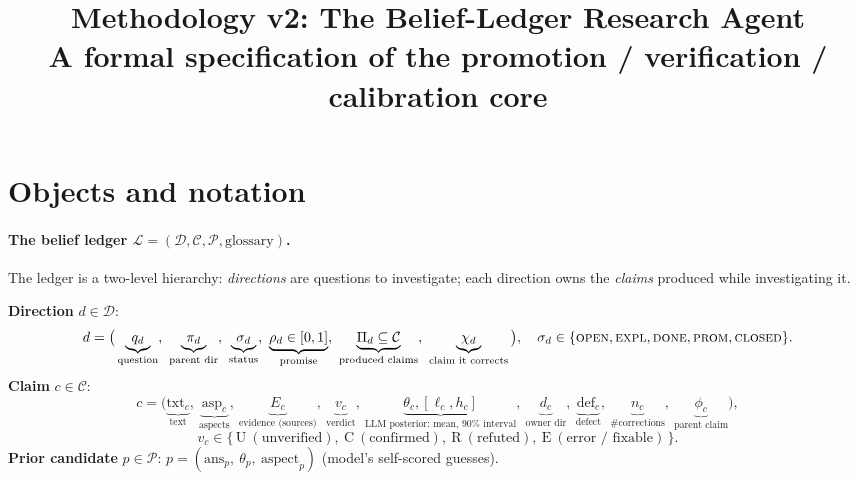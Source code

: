 \documentclass[11pt]{article}
\title{\textbf{Methodology v2: The Belief-Ledger Research Agent}\\[2pt]
\large A formal specification of the promotion / verification / calibration core}
\author{}
\date{}
\newcommand{\Ledger}{\mathcal{L}}
\newcommand{\Dirs}{\mathcal{D}}
\newcommand{\Claims}{\mathcal{C}}
\newcommand{\Priors}{\mathcal{P}}
\begin{document}
\maketitle

\section{Objects and notation}

\paragraph{The belief ledger $\Ledger=(\Dirs,\Claims,\Priors,\mathrm{glossary})$.}
The ledger is a two-level hierarchy: \emph{directions} are questions to investigate; each direction
owns the \emph{claims} produced while investigating it.

\smallskip
\noindent\textbf{Direction} $d\in\Dirs$:
\[
d=\big(\underbrace{q_d}_{\text{question}},\ \underbrace{\pi_d}_{\text{parent dir}},\
\underbrace{\sigma_d}_{\text{status}},\ \underbrace{\rho_d\in[0,1]}_{\text{promise}},\
\underbrace{\Pi_d\subseteq\Claims}_{\text{produced claims}},\
\underbrace{\chi_d}_{\text{claim it corrects}}\big),
\quad
\sigma_d\in\{\textsc{open},\textsc{expl},\textsc{done},\textsc{prom},\textsc{closed}\}.
\]
\textbf{Claim} $c\in\Claims$:
\[
c=\big(\underbrace{\mathrm{txt}_c}_{\text{text}},\
\underbrace{\mathrm{asp}_c}_{\text{aspects}},\
\underbrace{E_c}_{\text{evidence (sources)}},\
\underbrace{v_c}_{\text{verdict}},\
\underbrace{\theta_c,[\ell_c,h_c]}_{\text{LLM posterior: mean, }90\%\text{ interval}},\
\underbrace{d_c}_{\text{owner dir}},\
\underbrace{\mathrm{def}_c}_{\text{defect}},\
\underbrace{n_c}_{\text{\#corrections}},\
\underbrace{\phi_c}_{\text{parent claim}}\big),
\]
\[
v_c\in\{\,\mathrm{U}\ (\text{unverified}),\ \mathrm{C}\ (\text{confirmed}),\ \mathrm{R}\ (\text{refuted}),\ \mathrm{E}\ (\text{error / fixable})\,\}.
\]
\textbf{Prior candidate} $p\in\Priors$: $p=(\mathrm{ans}_p,\ \theta_p,\ \mathrm{aspect}_p)$ (model's self-scored guesses).
\end{document}
